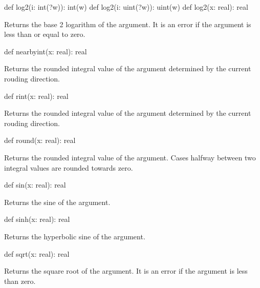 \begin{protohead}
def log2(i: int(?w)): int(w)
def log2(i: uint(?w)): uint(w)
def log2(x: real): real
\end{protohead}
\begin{protobody}
Returns the base 2 logarithm of the argument.  It is an error if the
argument is less than or equal to zero.
\end{protobody}

\begin{protohead}
def nearbyint(x: real): real
\end{protohead}
\begin{protobody}
Returns the rounded integral value of the argument determined by the
current rouding direction.
\end{protobody}

\begin{protohead}
def rint(x: real): real
\end{protohead}
\begin{protobody}
Returns the rounded integral value of the argument determined by the
current rouding direction.
\end{protobody}

\begin{protohead}
def round(x: real): real
\end{protohead}
\begin{protobody}
Returns the rounded integral value of the argument.  Cases halfway
between two integral values are rounded towards zero.
\end{protobody}

\begin{protohead}
def sin(x: real): real
\end{protohead}
\begin{protobody}
Returns the sine of the argument.
\end{protobody}

\begin{protohead}
def sinh(x: real): real
\end{protohead}
\begin{protobody}
Returns the hyperbolic sine of the argument.
\end{protobody}

\begin{protohead}
def sqrt(x: real): real
\end{protohead}
\begin{protobody}
Returns the square root of the argument.  It is an error if the
argument is less than zero.
\end{protobody}

